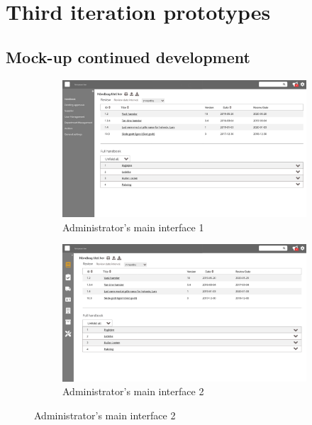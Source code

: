 \chapter{Third iteration prototypes}
\section{Mock-up continued development}\label{sec:2Mock}
\begin{figure}[H]
	\centering
	\begin{subfigure}[b]{0.48\textwidth}
		\includegraphics[width=\textwidth]{billeder/iteration3Prototyper/Page_11.jpg}
		\caption{Administrator's main interface 1}
		\label{fig:5-Main1}
	\end{subfigure}
	\quad
	\begin{subfigure}[b]{0.48\textwidth}
		\includegraphics[width=\textwidth]{billeder/iteration3Prototyper/Page_13.jpg}
		\caption{Administrator's main interface 2}
		\label{fig:5-Main2}
	\end{subfigure}
\end{figure}
